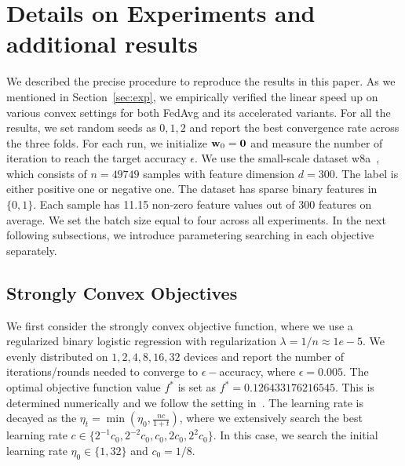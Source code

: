 
\section{Details on Experiments and additional results}
\label{sec:expsupp}

We described the precise procedure to reproduce the results in this paper.
As we mentioned in Section~\ref{sec:exp}, we empirically verified the
linear speed up on various convex settings for both FedAvg and its
accelerated variants. For all the results, we set random seeds as $0, 1, 2$
and report the best convergence rate across the three folds. For each
run, we initialize ${\mathbf{w}}_0 = \mathbf{0}$ and measure the number of iteration
to reach the target accuracy $\epsilon$. We use the small-scale dataset
w8a~\cite{platt1998fast}, which consists of $n = 49749 $ samples with
feature dimension $d = 300$. The label is either positive one or negative one.
The dataset has sparse binary features in $\{0, 1\}$. Each sample
has 11.15 non-zero feature values out of $300$ features on average.
We set the batch size equal to four across all experiments.
In the next following subsections,
we introduce parametering searching in each objective separately.


\subsection{Strongly Convex Objectives}
We first consider the strongly convex objective function, where we use
a regularized binary logistic regression with regularization $\lambda=1/n\approx 1e-5$. We evenly distributed on $1, 2, 4, 8, 16, 32$ devices and  report the number of iterations/rounds needed to converge to $\epsilon-$accuracy, where $\epsilon=0.005$. The optimal objective function value $f^*$
is set as $f^* = 0.126433176216545$. This is determined numerically and we follow the setting in~\cite{stich2018local}. The learning rate is decayed as the $\eta_t = \min(\eta_0, \frac{nc}{1 + t})$, where we extensively search the best learning rate $c \in \{2^{-1}c_0, 2^{-2}c_0, c_0, 2c_0, 2^{2}c_0\}$. In this case, we search the initial learning rate $\eta_0\in \{1, 32\}$ and $c_0 = 1/8$.


